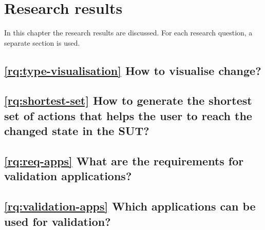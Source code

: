 \chapter{Research results}

In this chapter the research results are discussed.
For each research question, a separate section is used. 







\section{\ref{rq:type-visualisation} How to visualise change?} \label{rq:type-visualisation-answer}


\section{\ref{rq:shortest-set} How to generate the shortest set of actions that helps the user to reach the changed state in the SUT?}

\section{\ref{rq:req-apps} What are the requirements for validation applications?}

\section{\ref{rq:validation-apps} Which applications can be used for validation?}
